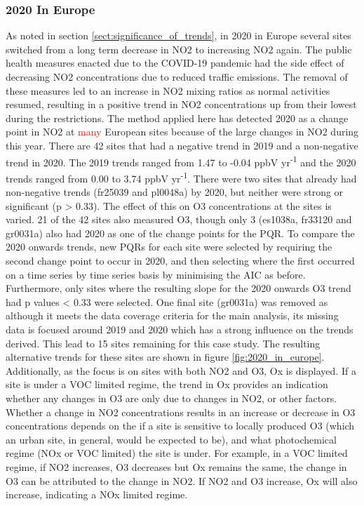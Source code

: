 \documentclass[journal abbreviation, manuscript]{copernicus}
\begin{document}
\subsubsection{2020 In Europe} \label{sect:2020_in_europe}
As noted in section \ref{sect:significance_of_trends}, in 2020 in Europe several sites switched from a long term decrease in NO2 to increasing NO2 again. The public health measures enacted due to the COVID-19 pandemic had the side effect of decreasing NO2 concentrations due to reduced traffic emissions. The removal of these measures led to an increase in NO2 mixing ratios as normal activities resumed, resulting in a positive trend in NO2 concentrations up from their lowest during the restrictions. The method applied here has detected 2020 as a change point in NO2 at \textcolor{red}{many} European sites because of the large changes in NO2 during this year. There are 42 sites that had a negative trend in 2019 and a non-negative trend in 2020. The 2019 trends ranged from 1.47 to -0.04 ppbV yr\textsuperscript{-1} and the 2020 trends ranged from 0.00 to 3.74 ppbV yr\textsuperscript{-1}. There were two sites that already had non-negative trends (fr25039 and pl0048a) by 2020, but neither were strong or significant (p > 0.33). 
The effect of this on O3 concentrations at the sites is varied.  21 of the 42 sites also measured O3, though only 3 (es1038a, fr33120 and gr0031a) also had 2020 as one of the change points for the PQR. To compare the 2020 onwards trends, new PQRs for each site were selected by requiring the second change point to occur in 2020, and then selecting where the first occurred on a time series by time series basis by minimising the AIC as before. Furthermore, only sites where the resulting slope for the 2020 onwards O3 trend had p values < 0.33 were selected. One final site (gr0031a) was removed as although it meets the data coverage criteria for the main analysis, its missing data is focused around 2019 and 2020 which has a strong influence on the trends derived. This lead to 15 sites remaining for this case study. 
The resulting alternative trends for these sites are shown in figure \ref{fig:2020_in_europe}. Additionally, as the focus is on sites with both NO2 and O3, Ox is displayed. If a site is under a VOC limited regime, the trend in Ox provides an indication whether any changes in O3 are only due to changes in NO2, or other factors. Whether a change in NO2 concentrations results in an increase or decrease in O3 concentrations depends on the if a site is sensitive to locally produced O3 (which an urban site, in general, would be expected to be), and what photochemical regime (NOx or VOC limited) the site is under. For example, in a VOC limited regime, if NO2 increases, O3 decreases but Ox remains the same, the change in O3 can be attributed to the change in NO2. If NO2 and O3 increase, Ox will also increase, indicating a NOx limited regime.
\end{document}
